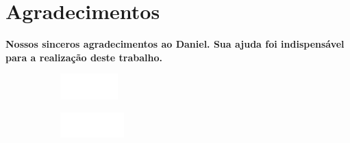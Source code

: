 \documentclass[aspectratio=169,t,xcolor=table]{beamer}
\begin{document}











\section{Agradecimentos}


\begin{frame}

	\centering

	\vspace{1cm}
	\textbf{Nossos sinceros agradecimentos ao Daniel. Sua ajuda foi indispensável para a realização deste trabalho.}

	\vspace{5cm}


	\begin{figure}
		\centering
		\begin{subfigure}{0.2\textwidth}
			\centering
			\includegraphics[height=1cm]{lib/logos/icmc.png}
		\end{subfigure}
		\qquad
		\begin{subfigure}{0.2\textwidth}
			\centering
			\includegraphics[height=1cm]{lib/logos/logo_usp_white.png}
		\end{subfigure}

	\end{figure}

\end{frame}
\end{document}

